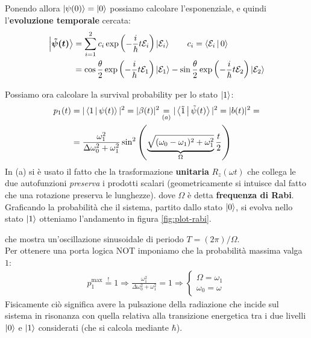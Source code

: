 \documentclass[../../InformazioneQuantistica.tex]{subfiles}
\begin{document}
\begin{enumerate}
Ponendo allora $\Ket{\psi(0)}=\Ket{0}$ possiamo calcolare l'esponenziale, e quindi l'\textbf{evoluzione temporale }cercata:
\begin{align*}
\bm{\Ket{\tilde{\psi}(t)}} &= \sum_{i=1}^2 c_i \exp\left(-\frac{i}{\hbar}t\mathcal{E}_i\right) \Ket{\mathcal{E}_i} \qquad c_i = \Braket{\mathcal{E}_i|0}\\
&= \cos\frac{\theta}{2} \exp\left(-\frac{i}{\hbar}t\mathcal{E}_1\right) \Ket{\mathcal{E}_1} -\sin\frac{\theta}{2} \exp\left(-\frac{i}{\hbar}t\mathcal{E}_2\right) \Ket{\mathcal{E}_2}
\end{align*}

Possiamo ora calcolare la survival probability per lo stato $\Ket{1}$: 
\begin{align*}
p_1(t) &= |\Braket{1|\psi(t)}|^2 = |\beta(t)|^2 \underset{(a)}{=}
|\Braket{\tilde{1}|\tilde{\psi}(t)}|^2=|b(t)|^2=
\\
&= \frac{\omega_1^2}{\Delta \omega_0^2 + \omega_1^2} \sin^2 \left(\underbrace{\sqrt{(\omega_0-\omega_1)^2 + \omega_1^2}}_{\Omega}\frac{t}{2}\right)
\end{align*}
In (a) si è usato il fatto che la trasformazione \textbf{unitaria} $R_z(\omega t)$ che collega le due autofunzioni \textit{preserva} i prodotti scalari (geometricamente si intuisce dal fatto che una rotazione preserva le lunghezze).
dove $\Omega$ è detta \textbf{frequenza di Rabi}.\\
Graficando la probabilità che il sistema, partito dallo stato $\Ket{0}$, si evolva nello stato $\Ket{1}$ otteniamo l'andamento in figura \ref{fig:plot-rabi}.


che mostra un'oscillazione sinusoidale di periodo $T=(2\pi)/\Omega$.\\

Per ottenere una porta logica NOT imponiamo che la probabilità massima valga $1$:
\begin{align*}
p_1^{\max} \overset{!}{=} 1 \Rightarrow \frac{\omega_1^2}{\Delta \omega_0^2 + \omega_1^2} = 1 \Rightarrow \begin{cases}
\Omega = \omega_1\\
\omega_0 = \omega
\end{cases}
\end{align*}
Fisicamente ciò significa avere la pulsazione della radiazione che incide sul sistema in risonanza con quella relativa alla transizione energetica tra i due livelli $\Ket{0}$ e $\Ket{1}$ considerati (che si calcola mediante $\hbar$).\\
\end{enumerate}
\end{document}
